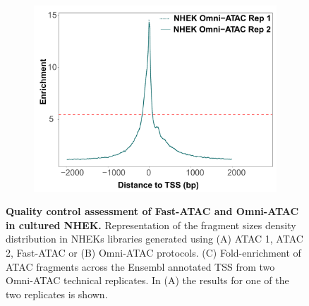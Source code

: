 \begin{figure}[htbp]
\begin{subfigure}{0.5\textwidth}
\centering
\includegraphics[width=\textwidth]{./Results1/pdfs/ATAC_skin_TSS_enrichment_NHEK_omni_ATAC}
\caption{\textbf{}} %
\end{subfigure}%
\caption[Quality control assessment of Fast-ATAC and Omni-ATAC in cultured NHEK]{\textbf{Quality control assessment of Fast-ATAC and Omni-ATAC in cultured NHEK.} Representation of the fragment sizes density distribution in NHEKs libraries generated using (A) ATAC 1, ATAC 2, Fast-ATAC or (B) Omni-ATAC protocols. (C) Fold-enrichment of ATAC fragments across the Ensembl annotated TSS from two Omni-ATAC technical replicates. In (A) the results for one of the two replicates is shown.}
\label{figure:Skin_ATAC1__ATAC2_Fast_ATAC_Omni_ATAC_QC_assessment}
\end{figure} 


